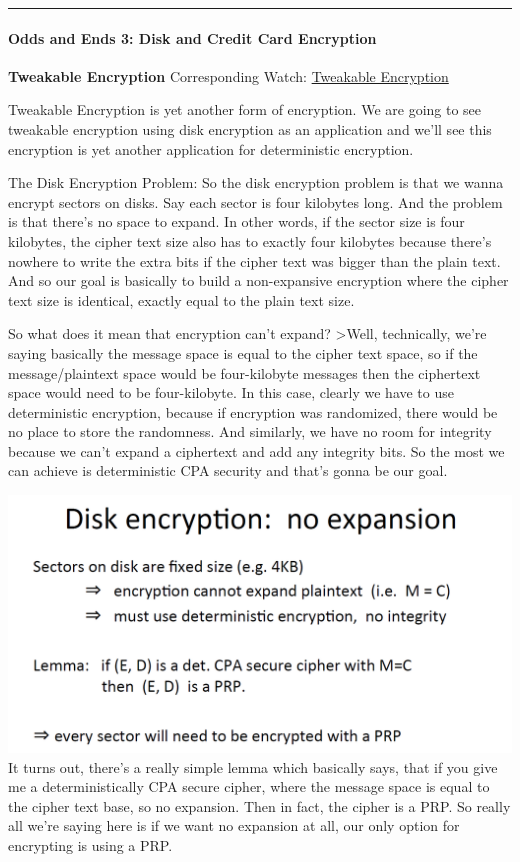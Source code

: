 \documentclass[11pt]{article}
\makeatletter
\def\maxwidth{\ifdim\Gin@nat@width>\linewidth\linewidth
    \else\Gin@nat@width\fi}
\let\Oldincludegraphics\includegraphics
\renewcommand{\includegraphics}[1]{\Oldincludegraphics[width=.8\maxwidth]{#1}}
\makeatother
\begin{document}
\begin{center}\rule{0.5\linewidth}{\linethickness}\end{center}

\hypertarget{odds-and-ends-3-disk-and-credit-card-encryption}{%
\paragraph{Odds and Ends 3: Disk and Credit Card
Encryption}\label{odds-and-ends-3-disk-and-credit-card-encryption}}

\textbf{Tweakable Encryption} Corresponding Watch:
\href{https://www.coursera.org/learn/crypto/lecture/YpC3s/tweakable-encryption}{Tweakable
Encryption}

Tweakable Encryption is yet another form of encryption. We are going to
see tweakable encryption using disk encryption as an application and
we'll see this encryption is yet another application for deterministic
encryption.

The Disk Encryption Problem: So the disk encryption problem is that we
wanna encrypt sectors on disks. Say each sector is four kilobytes long.
And the problem is that there's no space to expand. In other words, if
the sector size is four kilobytes, the cipher text size also has to
exactly four kilobytes because there's nowhere to write the extra bits
if the cipher text was bigger than the plain text. And so our goal is
basically to build a non-expansive encryption where the cipher text size
is identical, exactly equal to the plain text size.

So what does it mean that encryption can't expand? \textgreater{}Well,
technically, we're saying basically the message space is equal to the
cipher text space, so if the message/plaintext space would be
four-kilobyte messages then the ciphertext space would need to be
four-kilobyte. In this case, clearly we have to use deterministic
encryption, because if encryption was randomized, there would be no
place to store the randomness. And similarly, we have no room for
integrity because we can't expand a ciphertext and add any integrity
bits. So the most we can achieve is deterministic CPA security and
that's gonna be our goal.

\includegraphics{./Images/DiskEncryption-Lemma.png} It turns out,
there's a really simple lemma which basically says, that if you give me
a deterministically CPA secure cipher, where the message space is equal
to the cipher text base, so no expansion. Then in fact, the cipher is a
PRP. So really all we're saying here is if we want no expansion at all,
our only option for encrypting is using a PRP.
\end{document}
